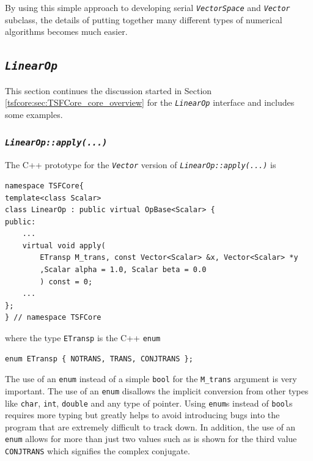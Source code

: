 By using this simple approach to developing serial
\texttt{\textit{VectorSpace}} and \texttt{\textit{Vector}} subclass,
the details of putting together many different types of numerical
algorithms becomes much easier.

%
\subsection{\texttt{\textit{LinearOp}}}
\label{tsfcore:sec:linear_op}
%

This section continues the discussion started in Section
\ref{tsfcore:sec:TSFCore_core_overview} for the
\texttt{\textit{LinearOp}} interface and includes some examples.

%
\subsubsection{\texttt{\textit{LinearOp::apply(\-...)}}}
\label{tsfcore:sec:linear_op_apply}
%

The C++ prototype for the \texttt{\textit{Vector}} version of
\texttt{\textit{LinearOp\-::apply(\-...)}} is

{\scriptsize\begin{verbatim}
namespace TSFCore{
template<class Scalar>
class LinearOp : public virtual OpBase<Scalar> {
public:
    ...
    virtual void apply(
        ETransp M_trans, const Vector<Scalar> &x, Vector<Scalar> *y
        ,Scalar alpha = 1.0, Scalar beta = 0.0
        ) const = 0;
    ...
};
} // namespace TSFCore
\end{verbatim}}

\noindent where the type \texttt{ETransp} is the C++ \texttt{enum}

{\scriptsize\begin{verbatim}
enum ETransp { NOTRANS, TRANS, CONJTRANS };
\end{verbatim}}

\noindent The use of an \texttt{enum} instead of a simple \texttt{bool} for the
\texttt{M\_trans} argument is very important.  The use of an \texttt{enum}
disallows the implicit conversion from other types like \texttt{char},
\texttt{int}, \texttt{double} and any type of pointer.  Using
\texttt{enum}s instead of \texttt{bool}s requires more typing but
greatly helps to avoid introducing bugs into the program that are
extremely difficult to track down.  In addition, the use of an
\texttt{enum} allows for more than just two values such as is shown
for the third value \texttt{CONJTRANS} which signifies the complex
conjugate.

